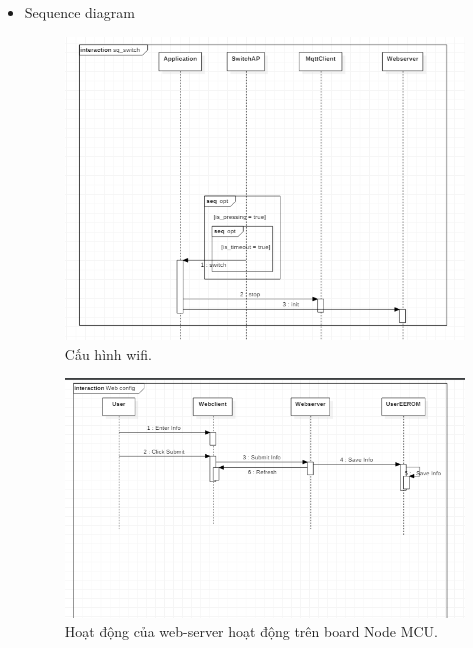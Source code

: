 \documentclass[a4paper,12pt,oneside]{article}
\begin{document}
\begin{itemize}

\item Sequence diagram

\begin{figure}[H]
\centering
\begin{center}
\includegraphics[scale=.9]{hinh/sq_switch_wifi.PNG}
\end{center}
\caption{Cấu hình wifi.}
\end{figure}

\begin{figure}[H]
\centering
\begin{center}
\includegraphics[scale=.8]{hinh/sq_web.PNG}
\end{center}
\caption{Hoạt động của web-server hoạt động trên board Node MCU.}
\end{figure}


\end{itemize}
\end{document}
